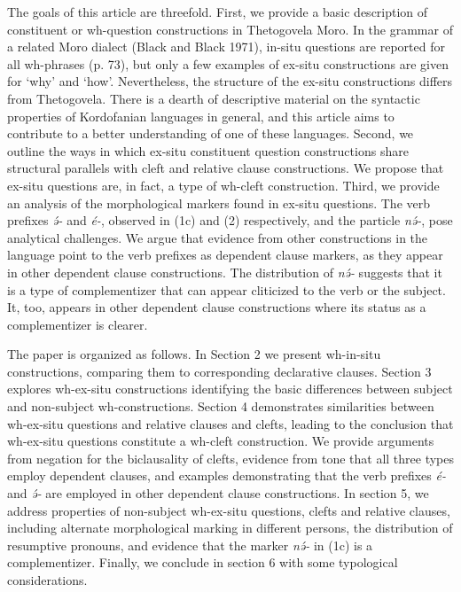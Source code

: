 The goals of this article are threefold. First, we provide a basic description of constituent or wh-question constructions in Thetogovela Moro. In the grammar of a related Moro dialect (Black and Black 1971), in-situ questions are reported for all wh-phrases (p. 73), but only a few examples of ex-situ constructions are given for ‘why’ and ‘how’. Nevertheless, the structure of the ex-situ constructions differs from Thetogovela. There is a dearth of descriptive material on the syntactic properties of Kordofanian languages in general, and this article aims to contribute to a better understanding of one of these languages. Second, we outline the ways in which ex-situ constituent question constructions share structural parallels with cleft and relative clause constructions. We propose that ex-situ questions are, in fact, a type of wh-cleft construction. Third, we provide an analysis of the morphological markers found in ex-situ questions.  The verb prefixes \textit{ə́-} and \textit{é-}, observed in (1c) and (2) respectively, and the particle \textit{nə́-}, pose analytical challenges. We argue that evidence from other constructions in the language point to the verb prefixes as dependent clause markers, as they appear in other dependent clause constructions. The distribution of \textit{nə́-} suggests that it is a type of complementizer that can appear cliticized to the verb or the subject. It, too, appears in other dependent clause constructions where its status as a complementizer is clearer. 

The paper is organized as follows. In Section 2 we present wh-in-situ constructions, comparing them to corresponding declarative clauses. Section 3 explores wh-ex-situ constructions identifying the basic differences between subject and non-subject wh-constructions. Section 4 demonstrates similarities between wh-ex-situ questions and relative clauses and clefts, leading to the conclusion that wh-ex-situ questions constitute a wh-cleft construction. We provide arguments from negation for the biclausality of clefts, evidence from tone that all three types employ dependent clauses, and examples demonstrating that the verb prefixes \textit{é-} and \textit{ə́-} are employed in other dependent clause constructions. In section 5, we address properties of non-subject wh-ex-situ questions, clefts and relative clauses, including alternate morphological marking in different persons, the distribution of resumptive pronouns, and evidence that the marker \textit{nə́-} in (1c) is a complementizer. Finally, we conclude in section 6 with some typological considerations. 

